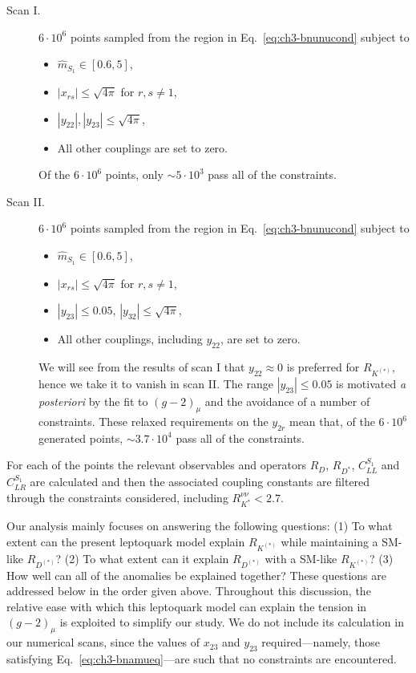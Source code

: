 \begin{description}
\item [Scan I.] $6 \cdot 10^6$ points sampled from the region in
  Eq.~\eqref{eq:ch3-bnunucond} subject to
  \begin{itemize}
  \item $\hat{m}_{S_{1}} \in [0.6,5]$,
  \item $|x_{rs}| \leq \sqrt{4\pi}$ for ${r,s \neq 1}$,
  \item $|y_{22}|, |y_{23}| \leq \sqrt{4\pi}$,
  \item All other couplings are set to zero.
  \end{itemize}
  Of the $6 \cdot 10^6$ points, only $\sim 5 \cdot 10^3$ pass all of the
  constraints.
\item [Scan II.] $6 \cdot 10^6$ points sampled from the region in
  Eq.~\eqref{eq:ch3-bnunucond} subject to
  \begin{itemize}
  \item $\hat{m}_{S_{1}} \in [0.6,5]$,
  \item $|x_{rs}| \leq \sqrt{4\pi}$ for ${r,s \neq 1}$,
  \item $|y_{23}| \leq 0.05$, $|y_{32}| \leq \sqrt{4\pi}$,
  \item All other couplings, including $y_{22}$, are set to zero.
  \end{itemize}
  We will see from the results of scan I that $y_{22} \approx 0$ is preferred
  for $R_{K^{(*)}}$, hence we take it to vanish in scan II. The range $|y_{23}|
  \leq 0.05$ is motivated \textit{a posteriori} by the fit to $(g - 2)_\mu$ and
  the avoidance of a number of constraints. These relaxed requirements on the
  $y_{2r}$ mean that, of the $6 \cdot 10^6$ generated points, $\sim 3.7 \cdot
  10^4$ pass all of the constraints.
\end{description}
For each of the points the relevant observables and operators $R_D$, $R_{D^*}$,
$C_{LL}^{S_{1}}$ and $C_{LR}^{S_{1}}$ are calculated and then the associated coupling
constants are filtered through the constraints considered, including
$R_{K^{*}}^{\nu\nu} < 2.7$.

Our analysis mainly focuses on answering the following questions: (1) To what
extent can the present leptoquark model explain $R_{K^{(*)}}$ while maintaining
a SM-like $R_{D^{(*)}}$? (2) To what extent can it explain $R_{D^{(*)}}$ with a
SM-like $R_{K^{(*)}}$? (3) How well can all of the anomalies be explained
together? These questions are addressed below in the order given above.
Throughout this discussion, the relative ease with which this leptoquark model
can explain the tension in $(g-2)_\mu$ is exploited to simplify our study. We do
not include its calculation in our numerical scans, since the values of $x_{23}$
and $y_{23}$ required---namely, those satisfying Eq.~\eqref{eq:ch3-bnamueq}---are
such that no constraints are encountered.


